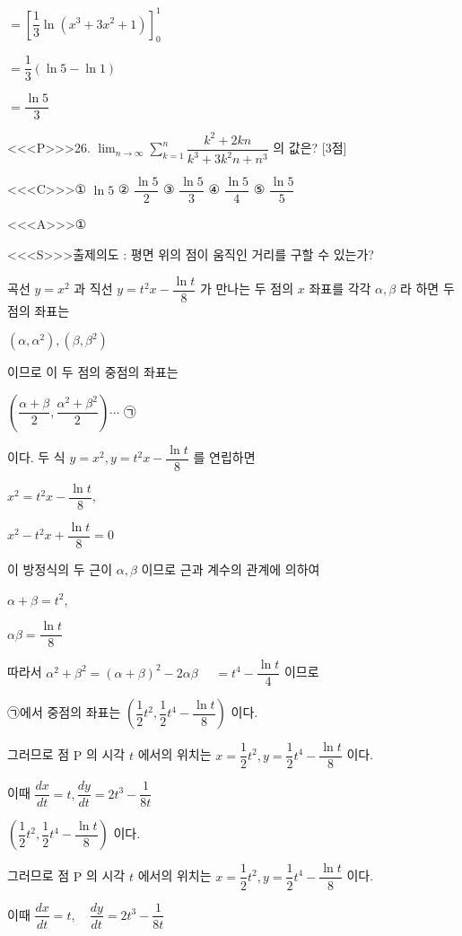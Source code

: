 \documentclass{oblivoir}
\begin{document}
$=\left[\dfrac{1}{3} \ln \left(x^{3}+3 x^{2}+1\right)\right]_{0}^{1}$

$=\dfrac{1}{3}(\ln 5-\ln 1)$

$=\dfrac{\ln 5}{3}$


<<<P>>>26. $\displaystyle\lim _{n \rightarrow \infty} \displaystyle\sum_{k=1}^{n} \dfrac{k^{2}+2 k n}{k^{3}+3 k^{2} n+n^{3}}$ 의 값은? [3점]

<<<C>>>① $\ln 5$
② $\dfrac{\ln 5}{2}$
③ $\dfrac{\ln 5}{3}$
④ $\dfrac{\ln 5}{4}$
⑤ $\dfrac{\ln 5}{5}$


<<<A>>>①

<<<S>>>출제의도 : 평면 위의 점이 움직인 거리를 구할 수 있는가?

곡선 $y=x^{2}$ 과 직선 $y=t^{2} x-\dfrac{\ln t}{8}$ 가 만나는 두 점의 $x$ 좌표를 각각 $\alpha, \beta$ 라 하면 두 점의 좌표는

$\left(\alpha, \alpha^{2}\right),\left(\beta, \beta^{2}\right)$

이므로 이 두 점의 중점의 좌표는

$\left(\dfrac{\alpha+\beta}{2}, \dfrac{\alpha^{2}+\beta^{2}}{2}\right) \cdots$ ㉠

이다. 두 식 $y=x^{2}, y=t^{2} x-\dfrac{\ln t}{8}$ 를 연립하면

$x^{2}=t^{2} x-\dfrac{\ln t}{8}$,

$x^{2}-t^{2} x+\dfrac{\ln t}{8}=0$

이 방정식의 두 근이 $\alpha, \beta$ 이므로 근과 계수의 관계에 의하여

$\alpha+\beta=t^{2}$,

$\alpha \beta=\dfrac{\ln t}{8}$

따라서 $\alpha^{2}+\beta^{2}=(\alpha+\beta)^{2}-2 \alpha \beta$ $\quad=t^{4}-\dfrac{\ln t}{4}$ 이므로 

㉠에서 중점의 좌표는 $\left(\dfrac{1}{2} t^{2}, \dfrac{1}{2} t^{4}-\dfrac{\ln t}{8}\right)$ 이다. 

그러므로 점 $\mathrm{P}$ 의 시각 $t$ 에서의 위치는 $x=\dfrac{1}{2} t^{2}, y=\dfrac{1}{2} t^{4}-\dfrac{\ln t}{8}$ 이다.

이때 $\dfrac{d x}{d t}=t, \dfrac{d y}{d t}=2 t^{3}-\dfrac{1}{8 t}$

$\left(\dfrac{1}{2} t^{2}, \dfrac{1}{2} t^{4}-\dfrac{\ln t}{8}\right)$ 이다.

그러므로 점 $\mathrm{P}$ 의 시각 $t$ 에서의 위치는
$x=\dfrac{1}{2} t^{2}, y=\dfrac{1}{2} t^{4}-\dfrac{\ln t}{8}$
이다.

이때
$\dfrac{d x}{d t}=t, \quad \dfrac{d y}{d t}=2 t^{3}-\dfrac{1}{8 t}$
\end{document}
